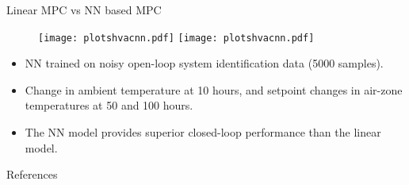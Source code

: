 \documentclass[xcolor=dvipsnames, 8pt]{beamer} %
\begin{document}
\begin{frame}{Linear MPC vs NN based MPC}
	\begin{figure}[!h]
		\centering
		\texttt{[image: plotshvacnn.pdf]} \hfill
		\texttt{[image: plotshvacnn.pdf]}
	\end{figure}
	\begin{itemize}
		\item NN trained on noisy open-loop system identification data (5000 samples).
		\item Change in ambient temperature at 10 hours, and setpoint changes in air-zone 
		temperatures at 50 and 100 hours. 
		\item The NN model provides superior closed-loop performance than the linear model.
	\end{itemize}
\end{frame}

	\begin{frame}{References}


\end{frame}
\end{document}
